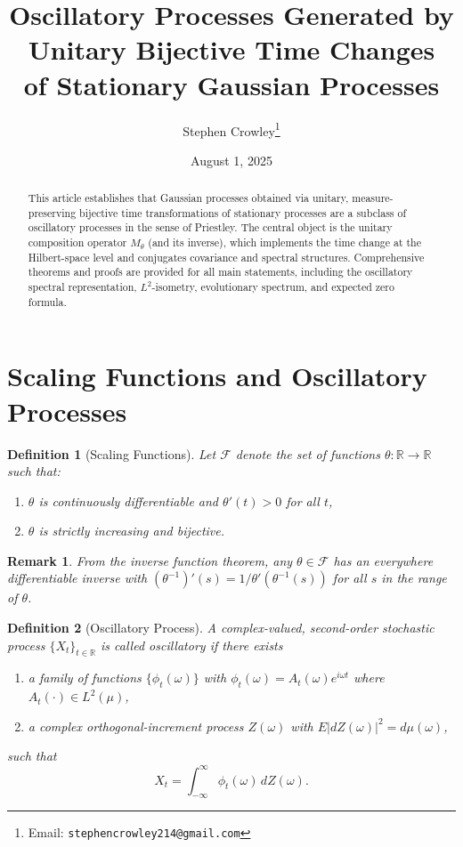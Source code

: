 \documentclass[11pt]{article}
\title{Oscillatory Processes Generated by Unitary Bijective Time Changes\\ of Stationary Gaussian Processes}
\author{Stephen Crowley\thanks{Email: \texttt{stephencrowley214@gmail.com}}}
\date{August 1, 2025}
\newtheorem{definition}{Definition}
\newtheorem{remark}{Remark}
\begin{document}
\maketitle

\begin{abstract}
This article establishes that Gaussian processes obtained via unitary, measure-preserving bijective time transformations of stationary processes are a subclass of oscillatory processes in the sense of Priestley. The central object is the unitary composition operator $M_\theta$ (and its inverse), which implements the time change at the Hilbert-space level and conjugates covariance and spectral structures. Comprehensive theorems and proofs are provided for all main statements, including the oscillatory spectral representation, $L^2$-isometry, evolutionary spectrum, and expected zero formula.
\end{abstract}

\section{Scaling Functions and Oscillatory Processes}

\begin{definition}[Scaling Functions]\label{def:scaling}
Let $\mathcal{F}$ denote the set of functions $\theta:\mathbb{R}\to\mathbb{R}$ such that:
\begin{enumerate}[label=(\alph*)]
    \item $\theta$ is continuously differentiable and $\theta'(t)>0$ for all $t$,
    \item $\theta$ is strictly increasing and bijective.
\end{enumerate}
\end{definition}

\begin{remark}
From the inverse function theorem, any $\theta \in \mathcal{F}$ has an everywhere differentiable inverse with
$(\theta^{-1})'(s) = 1/\theta'(\theta^{-1}(s))$ for all $s$ in the range of $\theta$.
\end{remark}

\begin{definition}[Oscillatory Process]\label{def:oscillatory}
A complex-valued, second-order stochastic process $\{X_t\}_{t\in\mathbb{R}}$ is called \emph{oscillatory} if there exists
\begin{enumerate}[label=(\roman*)]
    \item a family of functions $\{\phi_t(\omega)\}$ with $\phi_t(\omega)=A_t(\omega)e^{i\omega t}$ where $A_t(\cdot)\in L^2(\mu)$,
    \item a complex orthogonal-increment process $Z(\omega)$ with $E|dZ(\omega)|^2 = d\mu(\omega)$,
\end{enumerate}
such that
\begin{equation}\label{eq:oscrep}
    X_t = \int_{-\infty}^{\infty} \phi_t(\omega)\,dZ(\omega).
\end{equation}
\end{definition}
\end{document}
